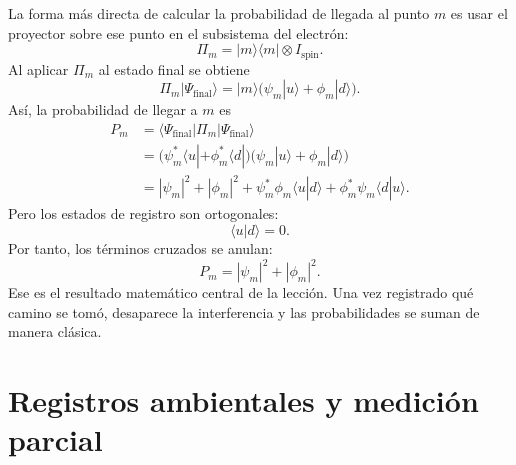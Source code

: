 La forma más directa de calcular la probabilidad de llegada al punto \(m\) es usar el proyector sobre ese punto en el subsistema del electrón:
\begin{equation}
\Pi_m = |m\rangle\langle m|\otimes I_{\mathrm{spin}}.
\end{equation}
Al aplicar \(\Pi_m\) al estado final se obtiene
\begin{equation}
\Pi_m |\Psi_{\mathrm{final}}\rangle
= |m\rangle\bigl(\psi_m|u\rangle+\phi_m|d\rangle\bigr).
\end{equation}
Así, la probabilidad de llegar a \(m\) es
\begin{align}
P_m
  &= \langle \Psi_{\mathrm{final}}|\Pi_m|\Psi_{\mathrm{final}}\rangle \\
  &= \bigl(\psi_m^*\langle u|+\phi_m^*\langle d|\bigr)
     \bigl(\psi_m|u\rangle+\phi_m|d\rangle\bigr) \\
  &= |\psi_m|^2 + |\phi_m|^2
     + \psi_m^*\phi_m\langle u|d\rangle
     + \phi_m^*\psi_m\langle d|u\rangle.
\end{align}
Pero los estados de registro son ortogonales:
\begin{equation}
\langle u|d\rangle=0.
\end{equation}
Por tanto, los términos cruzados se anulan:
\begin{equation}
P_m = |\psi_m|^2 + |\phi_m|^2.
\end{equation}
Ese es el resultado matemático central de la lección. Una vez registrado qué camino se tomó, desaparece la interferencia y las probabilidades se suman de manera clásica.

\begin{classroomqa}
\end{classroomqa}

\section{Registros ambientales y medición parcial}

